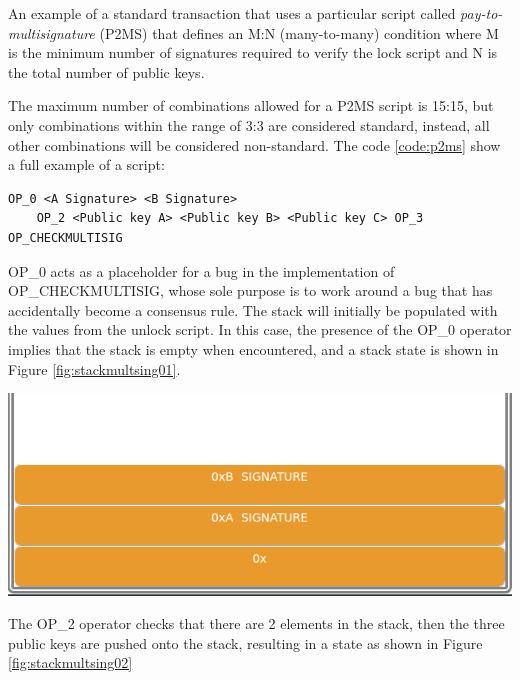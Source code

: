 \begin{example}
    \label{ex:p2ms_example}
    An example of a standard transaction that uses a particular script called \emph{pay-to-multisignature} (P2MS)
    that defines an M:N (many-to-many) condition where M is the minimum number of signatures required 
    to verify the lock script and N is the total number of public keys. 

    The maximum number of combinations allowed for a P2MS script is 15:15, but only 
    combinations within the range of 3:3 are considered standard, instead, all other combinations 
    will be considered non-standard. The code \ref{code:p2ms} show a full example of a script:

    \begin{lstlisting}[language=bitcoinscript, caption={Full example of pay-to-multisignature script.}, label={code:p2ms}]
    OP_0 <A Signature> <B Signature>
    OP_2 <Public key A> <Public key B> <Public key C> OP_3 OP_CHECKMULTISIG
    \end{lstlisting}

    OP\_0 acts as a placeholder for a bug in the implementation of OP\_CHECKMULTISIG, 
    whose sole purpose is to work around a bug that has accidentally become a consensus rule. The stack 
    will initially be populated with the values from the unlock script.
    In this case, the presence of the OP\_0 operator implies that the stack is empty when encountered, and 
    a stack state is shown in Figure \ref{fig:stackmultsing01}.

    {\centering
    \vspace{15pt}
    \includegraphics[scale=0.35]{imgs/script/multisig/1.png}
    \vspace{10pt}
    \par}

    The OP\_2 operator checks that there are 2 elements in the stack, then the three 
    public keys are pushed onto the stack, resulting in a state as shown in Figure \ref{fig:stackmultsing02}


\end{example}
